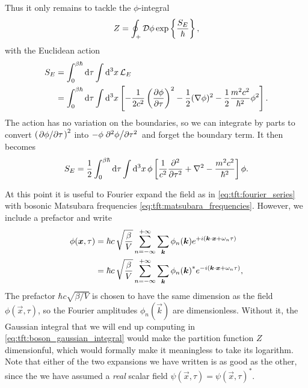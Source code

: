 Thus it only remains to tackle the $\phi$-integral
\begin{equation}
	Z = \oint_+ \mathcal{D} \phi \exp \left\{ \frac{S_E}{\hbar} \right\} ,
\label{eq:tft:boson_partition_function_momentum_out}
\end{equation}
with the Euclidean action
\begin{equation}
\begin{split}
	S_E &= \int_0^{\beta \hbar} \mathop{}\!\mathrm{d} \tau \int \mathop{}\!\mathrm{d}^3 x \, \mathcal{L}_E \\
	    &= \int_0^{\beta \hbar} \mathop{}\!\mathrm{d} \tau \int \mathop{}\!\mathrm{d}^3 x \left[ - \frac{1}{2c^2} \pdv{\phi}{\tau}^2 - \frac12 (\nabla \phi)^2 - \frac12 \frac{m^2 c^2}{\hbar^2} \phi^2 \right] .
\end{split}
\label{eq:tft:boson_euclidean_action_definition}
\end{equation}
The action has no variation on the boundaries, so we can integrate by parts to convert $\pdv{\phi}/{\tau}^2$ into $-\phi \pdv[2]{\phi}/{\tau}$ and forget the boundary term.
It then becomes
\begin{equation}
	S_E = \frac12 \int_0^{\beta \hbar} \mathop{}\!\mathrm{d} \tau \int \mathop{}\!\mathrm{d}^3 x \, \phi \left[ \frac{1}{c^2} \pdv[2]{}{\tau} + \nabla^2 - \frac{m^2 c^2}{\hbar^2} \right] \phi .
\label{eq:tft:boson_euclidean_action_nice}
\end{equation}

At this point it is useful to Fourier expand the field as in \eqref{eq:tft:fourier_series} with bosonic Matsubara frequencies \eqref{eq:tft:matsubara_frequencies}.
However, we include a prefactor and write
\begin{equation}
\begin{split}
	\phi({\bm{x}}, \tau) & = \hbar c \, \sqrt{\frac{\beta}{V}} \sum_{n=-\infty}^{+\infty} \sum_{{\bm{k}}}       \phi_n({\bm{k}})  e^{+i ({\bm{k}} \cdot {\bm{x}} + \omega_n \tau)} \\
	                    & = \hbar c \, \sqrt{\frac{\beta}{V}} \sum_{n=-\infty}^{+\infty} \sum_{{\bm{k}}} {\phi_n({\bm{k}})}^* e^{-i ({\bm{k}} \cdot {\bm{x}} + \omega_n \tau)} ,
\end{split}
\label{eq:tft:boson_fourier_series}
\end{equation}
The prefactor $\hbar c \sqrt{\beta/V}$ is chosen to have the same dimension as the field $\phi(\vec{x}, \tau)$, so the Fourier amplitudes $\phi_n(\vec{k})$ are dimensionless.
Without it, the Gaussian integral that we will end up computing in \cref{eq:tft:boson_gaussian_integral} would make the partition function $Z$ dimensionful, which would formally make it meaningless to take its logarithm.
Note that either of the two expansions we have written is as good as the other, since the we have assumed a \emph{real} scalar field $\psi(\vec{x},\tau) = \psi(\vec{x},\tau)^*$.

